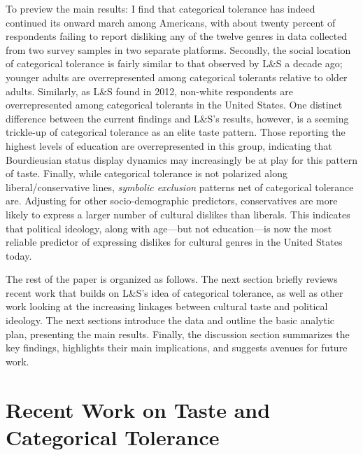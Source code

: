 \documentclass[12pt]{article}
\begin{document}
To preview the main results: I find that categorical tolerance has indeed continued its onward march among Americans, with about twenty percent of respondents failing to report disliking any of the twelve genres in data collected from two survey samples in two separate platforms. Secondly, the social location of categorical tolerance is fairly similar to that observed by L\&S a decade ago; younger adults are overrepresented among categorical tolerants relative to older adults. Similarly, as L\&S found in 2012, non-white respondents are overrepresented among categorical tolerants in the United States. One distinct difference between the current findings and L\&S's results, however, is a seeming trickle-up of categorical tolerance as an elite taste pattern. Those reporting the highest levels of education are overrepresented in this group, indicating that Bourdieusian status display dynamics may increasingly be at play for this pattern of taste. Finally, while categorical tolerance is not polarized along liberal/conservative lines, \textit{symbolic exclusion} patterns net of categorical tolerance are. Adjusting for other socio-demographic predictors, conservatives are more likely to express a larger number of cultural dislikes than liberals. This indicates that political ideology, along with age---but not education---is now the most reliable predictor of expressing dislikes for cultural genres in the United States today. 

The rest of the paper is organized as follows. The next section briefly reviews recent work that builds on L\&S's idea of categorical tolerance, as well as other work looking at the increasing linkages between cultural taste and political ideology. The next sections introduce the data and outline the basic analytic plan, presenting the main results. Finally, the discussion section summarizes the key findings, highlights their main implications, and suggests avenues for future work. 

\section*{Recent Work on Taste and Categorical Tolerance}
\end{document}
